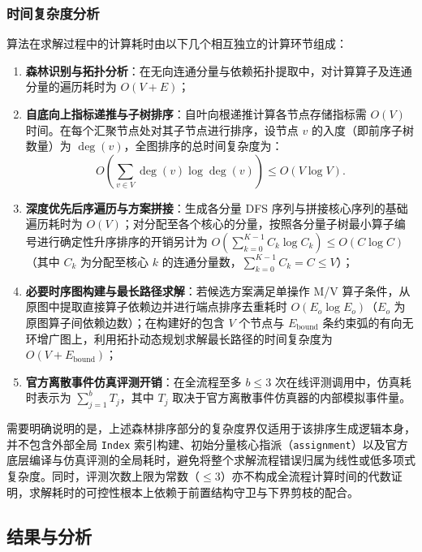 \documentclass[anonymous,withtoc]{gmcm2026}
\providecommand{\tightlist}{\setlength{\itemsep}{0pt}\setlength{\parskip}{0pt}}
\begin{document}
\subsubsection{时间复杂度分析}

算法在求解过程中的计算耗时由以下几个相互独立的计算环节组成：

\begin{enumerate}
\def\labelenumi{\arabic{enumi}.}
\tightlist
\item
  \textbf{森林识别与拓扑分析}：在无向连通分量与依赖拓扑提取中，对计算算子及连通分量的遍历耗时为 \(O(V + E)\)；
\item
  \textbf{自底向上指标递推与子树排序}：自叶向根递推计算各节点存储指标需 \(O(V)\) 时间。在每个汇聚节点处对其子节点进行排序，设节点 \(v\) 的入度（即前序子树数量）为 \(\deg(v)\)，全图排序的总时间复杂度为： \begin{equation}
O\left( \sum_{v \in V} \deg(v) \log \deg(v) \right) \le O(V \log V).
\end{equation}
\item
  \textbf{深度优先后序遍历与方案拼接}：生成各分量 DFS 序列与拼接核心序列的基础遍历耗时为 \(O(V)\)；对分配至各个核心的分量，按照各分量子树最小算子编号进行确定性升序排序的开销另计为 \(O\left(\sum_{k=0}^{K-1} C_k \log C_k\right) \le O(C \log C)\)（其中 \(C_k\) 为分配至核心 \(k\) 的连通分量数，\(\sum_{k=0}^{K-1} C_k = C \le V\)）；
\item
  \textbf{必要时序图构建与最长路径求解}：若候选方案满足单操作 M/V 算子条件，从原图中提取直接算子依赖边并进行端点排序去重耗时 \(O(E_o \log E_o)\)（\(E_o\) 为原图算子间依赖边数）；在构建好的包含 \(V\) 个节点与 \(E_{\mathrm{bound}}\) 条约束弧的有向无环增广图上，利用拓扑动态规划求解最长路径的时间复杂度为 \(O(V + E_{\mathrm{bound}})\)；
\item
  \textbf{官方离散事件仿真评测开销}：在全流程至多 \(b \le 3\) 次在线评测调用中，仿真耗时表示为 \(\sum_{j=1}^b T_j\)，其中 \(T_j\) 取决于官方离散事件仿真器的内部模拟事件量。
\end{enumerate}

需要明确说明的是，上述森林排序部分的复杂度界仅适用于该排序生成逻辑本身，并不包含外部全局 \texttt{Index} 索引构建、初始分量核心指派（\texttt{assignment}）以及官方底层编译与仿真评测的全局耗时，避免将整个求解流程错误归属为线性或低多项式复杂度。同时，评测次数上限为常数（\(\le 3\)）亦不构成全流程计算时间的代数证明，求解耗时的可控性根本上依赖于前置结构守卫与下界剪枝的配合。

\subsection{结果与分析}
\end{document}

